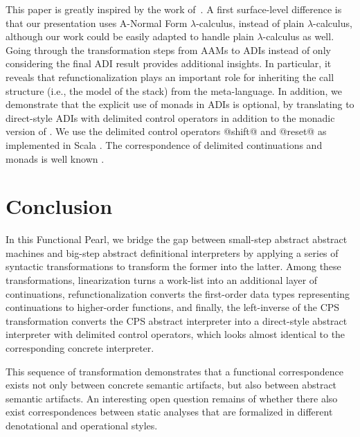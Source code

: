 \documentclass[acmsmall, screen]{acmart}\settopmatter{}
\begin{document}
This paper is greatly inspired by the work of~\citet{darais2017abstracting}.
A first surface-level difference is that our presentation uses A-Normal Form $\lambda$-calculus,
instead of plain $\lambda$-calculus, although our work could be easily adapted to handle plain
$\lambda$-calculus as well. Going through the transformation steps from AAMs to ADIs instead of
only considering the final ADI result provides additional insights. In particular, it reveals that
refunctionalization plays an important role for inheriting the call structure (i.e., the model of
the stack) from the meta-language.
In addition, we demonstrate that the explicit use of monads in ADIs is optional, by translating to
direct-style ADIs with delimited control operators in addition to the monadic version of \citet{darais2017abstracting}.
We use the delimited control operators @shift@ and @reset@ \cite{Danvy:1990:AC:91556.91622} as implemented in Scala
\cite{rompf2009implementing}. The correspondence of delimited continuations and monads is well known
\cite{Danvy:1990:AC:91556.91622, wadler1992essence, danvy1992representing, moggi1991notions, filinski1994representing}.

\section{Conclusion}\label{sec:conclusion}


In this Functional Pearl, we bridge the gap between small-step abstract abstract machines
and big-step abstract definitional interpreters by applying a series of syntactic
transformations to transform the former into the latter. Among these transformations,
linearization turns a work-list into an additional layer of continuations, refunctionalization
converts the first-order data types representing continuations to higher-order functions,
and finally, the left-inverse of the CPS transformation converts the CPS abstract interpreter
into a direct-style abstract interpreter with delimited control operators, which looks almost
identical to the corresponding concrete interpreter.

This sequence of transformation demonstrates that a functional correspondence exists
not only between concrete semantic artifacts, but also between abstract semantic artifacts.
An interesting open question remains of whether there also exist
correspondences between static analyses that are formalized in different
denotational and operational styles.
\end{document}
